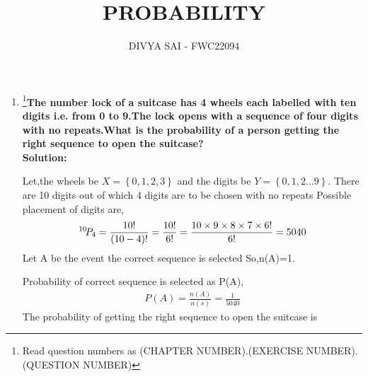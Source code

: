 \documentclass{article}
\providecommand{\cbrak}[1]{\ensuremath{\left\{#1\right\}}}
\newcommand*{\permcomb}[4][0mu]{{{}^{#3}\mkern#1#2_{#4}}}
\newcommand*{\perm}[1][-3mu]{\permcomb[#1]{P}}
\begin{document}
\title{PROBABILITY}
\author{\Large DIVYA SAI - FWC22094}
\date{}

\maketitle
\begin{enumerate}[label=16.\arabic{enumi}.\arabic{enumii}]%
\setcounter{enumi}{3}
\setcounter{enumii}{10}

\item \footnote{Read question numbers as (CHAPTER NUMBER).(EXERCISE NUMBER).(QUESTION NUMBER)}\textbf {The number lock of a suitcase has 4 wheels each labelled with ten digits i.e. from 0 to 9.The lock opens with a sequence of four digits with no repeats.What is the probability of a person getting the right sequence to open the suitcase?}\\[1ex]

\textbf{Solution:}

Let,the wheels be $X =\cbrak{0,1,2,3}$ and the digits be $Y=\cbrak{0,1,2...9}$.
There are 10 digits out of which 4 digits are to be chosen with no repeats
Possible placement of digits are,
\begin{align}
\perm{10}{4}=\frac{10!}{(10-4)!}=\frac{10!}{6!}=\frac{10 \times 9 \times 8 \times 7 \times	 6!}{6!}=5040
\end{align}
Let A be the event the correct sequence is selected So,n(A)=1.

Probability of correct sequence is selected as P(A),
\begin{align}
P(A)=\frac{n(A)}{n(s)}=\frac{1}{5040}
\end{align}
The probability of getting the right sequence to open the suitcase is 
\end{enumerate}
\end{document}
